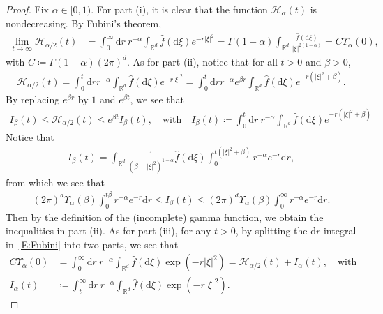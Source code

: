 \documentclass[a4paper,11pt]{article}%
\theoremstyle{plain}
\theoremstyle{definition}
\numberwithin{equation}{section}
\newcommand{\R}{\mathbb{R}}
\newcommand{\ud}{\ensuremath{\mathrm{d}}}
\begin{document}
\begin{proof}
  Fix $\alpha\in[0,1)$. For part (i), it is clear that the function $\mathcal{H}_\alpha(t)$ is
  nondecreasing. By Fubini's theorem,
  \begin{align}\label{E:Fubini}
    \lim_{t\to\infty}\mathcal{H}_{\alpha/2}(t)
    & = \int_0^\infty \ud r \: r^{-\alpha} \int_{\R^d} \widehat{f}(\ud\xi)e^{-r|\xi|^2}
      = \Gamma(1-\alpha) \int_{\R^d} \frac{\widehat{f}(\ud\xi)}{|\xi|^{2\left(1-\alpha\right)}}
      = C \Upsilon_{\alpha}(0),
  \end{align}
  with $C\coloneqq \Gamma(1-\alpha)(2\pi)^d$. As for part (ii), notice that for all $t>0$ and
  $\beta>0$,
  \begin{align*}
    \mathcal{H}_{\alpha /2}(t)
    = \int_0^t \ud r r^{-\alpha} \int_{\R^d} \widehat{f}(\ud\xi)e^{-r|\xi|^2}
    = \int_0^t \ud r r^{-\alpha} e^{\beta r} \int_{\R^d} \widehat{f}(\ud\xi)e^{-r\left(|\xi|^2 +\beta\right)}.
  \end{align*}
  By replacing $e^{\beta r}$ by $1$ and $e^{\beta t}$, we see that
  \begin{align*}
    I_\beta(t)
    \le \mathcal{H}_{\alpha /2}(t)
    \le e^{\beta t} I_\beta(t), \quad \text{with} \quad
    I_\beta(t)\coloneqq
    \int_0^t \ud r\: r^{-\alpha} \int_{\R^d} \widehat{f}(\ud\xi)e^{-r\left(|\xi|^2+\beta\right)}
  \end{align*}
   Notice that
  \begin{align*}
    I_\beta(t)
    = \int_{\R^d} \frac{1}{\left(\beta+|\xi|^2\right)^{1-\alpha}} \widehat{f}(\ud\xi)
      \int_{0}^{t\left(|\xi|^2 + \beta\right)} r^{-\alpha} e^{-r} \ud r,
  \end{align*}
  from which we see that
  \begin{align*}
    \left(2\pi\right)^d\Upsilon_\alpha(\beta) \int_{0}^{t \beta} r^{-\alpha} e^{-r} \ud r
    \le I_\beta(t) \le
    \left(2\pi\right)^d\Upsilon_\alpha(\beta) \int_{0}^{\infty} r^{-\alpha} e^{-r} \ud r.
  \end{align*}
  Then by the definition of the (incomplete) gamma function, we obtain the inequalities in part
(ii). As for part (iii), for any $t>0$, by splitting the $\ud r$ integral in~\eqref{E:Fubini} into
two parts, we see that
  \begin{align*}
    C \Upsilon_{\alpha}(0) & = \int_0^\infty \ud r \: r^{-\alpha} \int_{\R^d} \widehat{f}(\ud\xi)\exp\left(-r|\xi|^2\right) = \mathcal{H}_{\alpha/2}(t) + I_\alpha(t), \quad \text{with} \\
    I_\alpha(t)            & \coloneqq \int_t^\infty \ud r \: r^{-\alpha} \int_{\R^d} \widehat{f}(\ud\xi)\exp\left(-r|\xi|^2\right).

\end{align*}
\end{proof}
\end{document}
